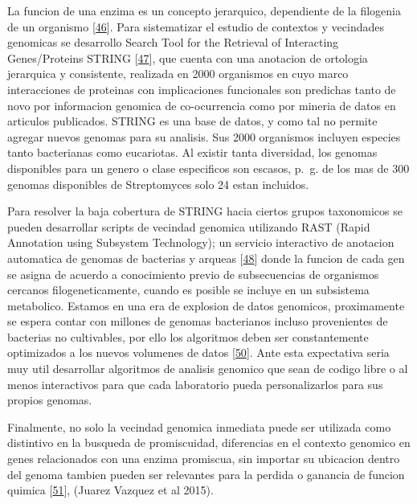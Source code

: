 \documentclass[12pt,twoside]{reedthesis}
\begin{document}
  La funcion de una enzima es un concepto jerarquico, dependiente de la
  filogenia de un organismo
  {[}\protect\hyperlink{ref-szklarczykux5fstringux5f2015}{46}{]}. Para
  sistematizar el estudio de contextos y vecindades genomicas se
  desarrollo Search Tool for the Retrieval of Interacting Genes/Proteins
  STRING {[}\protect\hyperlink{ref-snelux5fstring:ux5f2000}{47}{]}, que
  cuenta con una anotacion de ortologia jerarquica y consistente,
  realizada en 2000 organismos en cuyo marco interacciones de proteinas
  con implicaciones funcionales son predichas tanto de novo por
  informacion genomica de co-ocurrencia como por mineria de datos en
  articulos publicados. STRING es una base de datos, y como tal no permite
  agregar nuevos genomas para su analisis. Sus 2000 organismos incluyen
  especies tanto bacterianas como eucariotas. Al existir tanta diversidad,
  los genomas disponibles para un genero o clase especificos son escasos,
  p.~g. de los mas de 300 genomas disponibles de Streptomyces solo 24
  estan incluidos.
  
  Para resolver la baja cobertura de STRING hacia ciertos grupos
  taxonomicos se pueden desarrollar scripts de vecindad genomica
  utilizando RAST (Rapid Annotation using Subsystem Technology); un
  servicio interactivo de anotacion automatica de genomas de bacterias y
  arqueas {[}\protect\hyperlink{ref-azizux5frastux5f2008}{48}{]} donde la
  funcion de cada gen se asigna de acuerdo a conocimiento previo de
  subsecuencias de organismos cercanos filogeneticamente, cuando es
  posible se incluye en un subsistema metabolico. Estamos en una era de
  explosion de datos genomicos, proximamente se espera contar con millones
  de genomas bacterianos incluso provenientes de bacterias no cultivables,
  por ello los algoritmos deben ser constantemente optimizados a los
  nuevos volumenes de datos
  {[}\protect\hyperlink{ref-medemaux5fcomputationalux5f2015}{50}{]}. Ante
  esta expectativa seria muy util desarrollar algoritmos de analisis
  genomico que sean de codigo libre o al menos interactivos para que cada
  laboratorio pueda personalizarlos para sus propios genomas.
  
  Finalmente, no solo la vecindad genomica inmediata puede ser utilizada
  como distintivo en la busqueda de promiscuidad, diferencias en el
  contexto genomico en genes relacionados con una enzima promiscua, sin
  importar su ubicacion dentro del genoma tambien pueden ser relevantes
  para la perdida o ganancia de funcion quimica
  {[}\protect\hyperlink{ref-noda-garciaux5fevolutionux5f2013}{51}{]},
  (Juarez Vazquez et al 2015).
  
\end{document}
